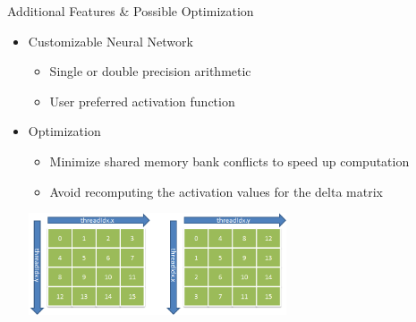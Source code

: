 \begin{frame}{Additional Features \& Possible Optimization}
\begin{itemize}

\item{Customizable Neural Network}
\begin{itemize}
\item{Single or double precision arithmetic}
\item{User preferred activation function}
\end{itemize}

\item{Optimization}
\begin{itemize}
\item{Minimize shared memory bank conflicts to speed up computation}


\item{Avoid recomputing the activation values for the delta matrix }
\end{itemize}

\includegraphics[width=3.0in]{gpu_mem_access.png}


\end{itemize}
\end{frame}
    
